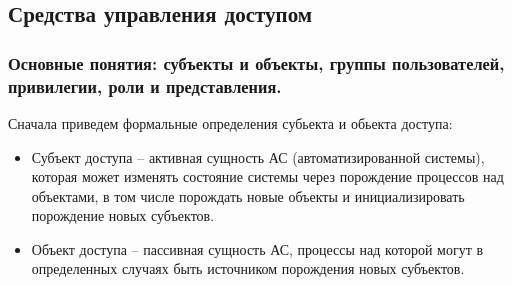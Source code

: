 \subsection{Средства управления доступом}
\subsubsection{Основные понятия: субъекты и объекты, группы пользователей, привилегии, роли и представления.}
Сначала приведем формальные определения субьекта и обьекта доступа:

\begin{itemize}
    \item Субъект доступа – активная сущность АС (автоматизированной системы), которая может
        изменять состояние системы через порождение процессов над объектами, в том числе порождать
        новые объекты и инициализировать порождение новых субъектов.
    \item Объект доступа – пассивная сущность АС, процессы над которой могут в определенных случаях
        быть источником порождения новых субъектов.
\end{itemize}

